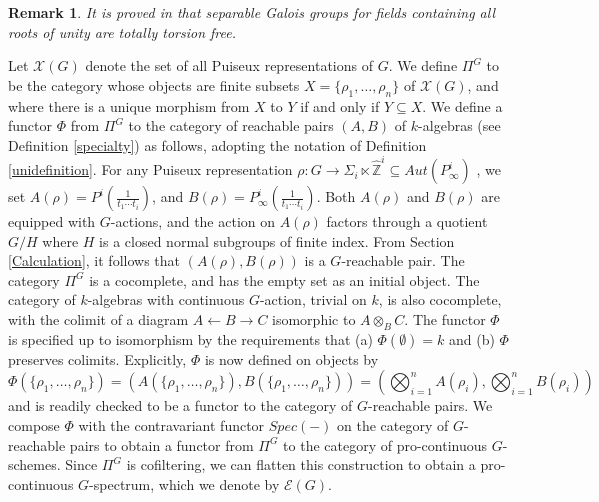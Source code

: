 \documentclass[11pt]{article}
\newcommand\mb{\mathbb}
\newcommand\mc{\mathcal}
\newtheorem{Remark}{Remark}[section]
\begin{document}
\begin{Remark} It is proved in \cite{royg1} that  separable    Galois groups for fields containing all roots of unity are totally torsion free. 
\end{Remark}
Let $\mc{X}(G) $ denote the  set of all Puiseux representations of $G$.  We define  $\Pi^G$ to be  the category  whose objects  are finite 
subsets $X = \{\rho _1, \ldots , \rho _n \} $ of $\mc{X}(G)$, and where there is a unique morphism from $X$ to $Y$ if and only if  $Y \subseteq 
X$. We define a functor $\Phi$ from $\Pi^G$ to the category of reachable pairs $(A,B) $ of $k$-algebras (see Definition \ref{specialty}) as follows, adopting the notation of Definition \ref{unidefinition}.  For any Puiseux 
representation 
$\rho: G \rightarrow \Sigma _i \ltimes \hat{\mb{Z}}^i  \subseteq Aut(P^i_{\infty})$
, we set $A(\rho) = 
 P^i (\frac{1}{t_1 \cdots t_i })$, and $B(\rho) =  P^i_{\infty}(\frac{1}{t_1 \cdots t_i })$. Both $A(\rho)$ and $B(\rho)$ are equipped with $G$-actions, and the action on $A(\rho)$ factors through a quotient $G/H$ where $H$ is a closed normal subgroups of finite index.  From Section \ref{Calculation}, it follows that $(A(\rho), B(\rho))$ is a $G$-reachable pair. The category $\Pi^G$  is a cocomplete, and has the empty set 
 as an initial object. The category of $k$-algebras with continuous $G$-action, trivial on $k$, is also cocomplete, with the colimit of a diagram $A \leftarrow B \rightarrow C$ isomorphic to $A \otimes _B C$. The functor $\Phi$ is specified up to isomorphism by the requirements that (a) $\Phi (\emptyset) = k $ and (b) $\Phi$ preserves colimits.  
 Explicitly,  $\Phi$ is now defined on objects by 
$$ \Phi (\{\rho _1, \ldots , \rho _n \} ) = (A(\{ \rho _1, \ldots , \rho _n \} ), B(\{ \rho _1, \ldots , \rho _n \} ))= (\bigotimes _{i=1}^n A(\rho _i), \bigotimes _{i=1}^nB(\rho _i)) 
$$ and is readily checked to be a functor to the category of $G$-reachable pairs.  We compose $\Phi$ with the contravariant functor $Spec(-) $ on the category of $G$-reachable pairs to obtain a functor from $\Pi^G $ to the category of pro-continuous $G$-schemes.  Since $\Pi^G$ is cofiltering, we can flatten this construction to obtain a pro-continuous $G$-spectrum, which we denote by $\mc{E}(G)$. 
\end{document}
